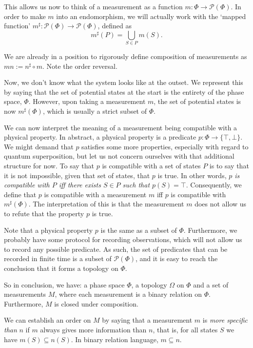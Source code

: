 \documentclass{article}
\theoremstyle{definition}
\theoremstyle{plain}
\newcommand{\ps}{\mathcal{P}}
\begin{document}
This allows us now to think of a measurement as a function $m : \Phi \to \ps(\Phi)$. In order to make $m$ into an endomorphism, we will actually work with the `mapped function' $m^\sharp : \ps(\Phi) \to \ps(\Phi)$, defined as
\[m^\sharp(P) = \bigcup_{S \in P} m(S).\]

We are already in a position to rigorously define composition of measurements as $mn := n^\sharp \circ m$. Note the order reversal.

Now, we don't know what the system looks like at the outset. We represent this by saying that the set of potential states at the start is the entirety of the phase space, $\Phi$. However, upon taking a measurement $m$, the set of potential states is now $m^\sharp(\Phi)$, which is usually a strict subset of $\Phi$.

We can now interpret the meaning of a measurement being compatible with a physical property. In abstract, a physical property is a predicate $p : \Phi \to \{\top, \bot\}$. We might demand that $p$ satisfies some more properties, especially with regard to quantum superposition, but let us not concern ourselves with that additional structure for now. To say that $p$ is compatible with a set of states $P$ is to say that it is not impossible, given that set of states, that $p$ is true. In other words, \emph{$p$ is compatible with $P$ iff there exists $S \in P$ such that $p(S) = \top$}. Consequently, we define that $p$ is compatible with a measurement $m$ iff $p$ is compatible with $m^\sharp(\Phi)$. The interpretation of this is that the measurement $m$ does not allow us to refute that the property $p$ is true.

Note that a physical property $p$ is the same as a subset of $\Phi$. Furthermore, we probably have some protocol for recording observations, which will not allow us to record any possible predicate. As such, the set of predicates that can be recorded in finite time is a subset of $\ps(\Phi)$, and it is easy to reach the conclusion that it forms a topology on $\Phi$.

So in conclusion, we have: a phase space $\Phi$, a topology $\Omega$ on $\Phi$ and a set of measurements $M$, where each measurement is a binary relation on $\Phi$. Furthermore, $M$ is closed under composition.

We can establish an order on $M$ by saying that a measurement $m$ is \emph{more specific than} $n$ if $m$ always gives more information than $n$, that is, for all states $S$ we have $m(S) \subseteq n(S)$. In binary relation language, $m \subseteq n$.
\end{document}

